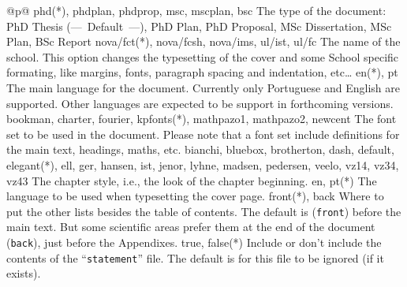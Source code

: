 \noindent
\begin{ctabular}{@{}p{\linewidth}@{}}
  \toprule
    {phd(*), phdplan, phdprop, msc, mscplan, bsc}%
    {The type of the document: PhD Thesis (---~Default~---), PhD Plan, PhD Proposal, MSc Dissertation, MSc Plan, BSc Report}
    \midrule
    {nova/fct(*), nova/fcsh, nova/ims, ul/ist, ul/fc}%
    {The name of the school. This option changes the typesetting of the cover and some School specific formating, like margins, fonts, paragraph spacing and indentation, etc…}
    \midrule
    {en(*), pt}%
    {The main language for the document.  Currently only Portuguese and English are supported.  Other languages are expected to be support in forthcoming versions.}
    \midrule
    {bookman, charter, fourier, kpfonts(*), mathpazo1, mathpazo2, newcent}%
    {The font set to be used in the document.  Please note that a font set include definitions for the main text, headings, maths, etc.}
    \midrule
    {bianchi, bluebox, brotherton, dash, default, elegant(*), ell, ger, hansen, ist, jenor, lyhne, madsen, pedersen, veelo, vz14, vz34, vz43}%
    {The chapter style, i.e., the look of the chapter beginning.}
    \midrule
    {en, pt(*)}%
    {The language to be used when typesetting the cover page.}
    \midrule
    {front(*), back}%
    {Where to put the other lists besides the table of contents. The default is (\texttt{front}) before the main text.  But some scientific areas prefer them at the end of the document (\texttt{back}), just before the Appendixes.}
    \midrule
    {true, false(*)}%
    {Include or don't include the contents of the “\texttt{statement}” file. The default is for this file to be ignored (if it exists).}
    \midrule

\end{ctabular}
